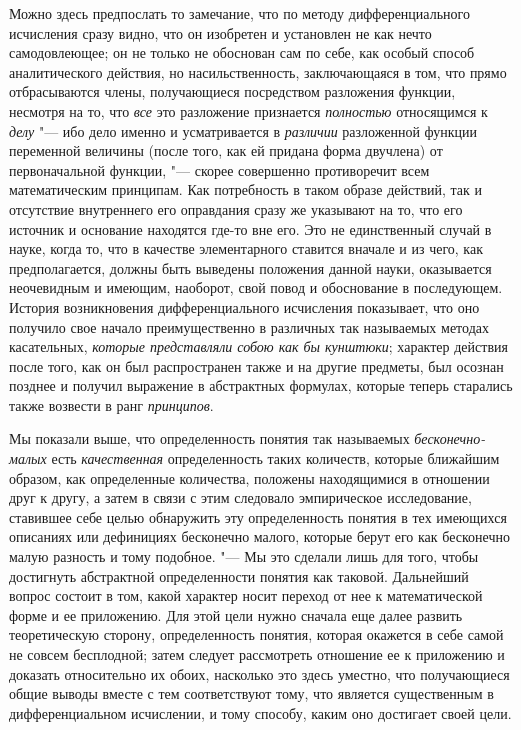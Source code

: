 Можно здесь предпослать то замечание, что по методу дифференциального
исчисления сразу видно, что он изобретен и установлен не как нечто
самодовлеющее; он не только не обоснован сам по себе, как особый способ
аналитического действия, но насильственность, заключающаяся в том, что
прямо отбрасываются члены, получающиеся посредством разложения функции,
несмотря на то, что {\em все} это разложение признается
{\em полностью} относящимся к
{\em делу} "--- ибо дело именно и усматривается в
{\em различии} разложенной функции переменной величины
(после того, как ей придана форма двучлена) от первоначальной функции, "---
скорее совершенно противоречит всем математическим принципам. Как
потребность в таком образе действий, так и отсутствие внутреннего его
оправдания сразу же указывают на то, что его источник и основание находятся
где-то вне его. Это не единственный случай в науке, когда то, что в
качестве элементарного ставится вначале и из чего, как предполагается,
должны быть выведены положения данной науки, оказывается неочевидным и
имеющим, наоборот, свой повод и обоснование в последующем. История
возникновения дифференциального исчисления показывает, что оно получило свое
начало преимущественно в различных так называемых методах касательных,
{\em которые представляли собою как бы кунштюки};
характер действия после того, как он был распространен также и на другие
предметы, был осознан позднее и получил выражение в абстрактных формулах,
которые теперь старались также возвести в ранг
{\em принципов}.

Мы показали выше, что определенность понятия так называемых
{\em бесконечно-малых} есть
{\em качественная} определенность таких количеств,
которые ближайшим образом, как определенные количества, положены
находящимися в отношении друг к другу, а затем в связи с этим следовало
эмпирическое исследование, ставившее себе целью обнаружить эту
определенность понятия в тех имеющихся описаниях или дефинициях бесконечно
малого, которые берут его как бесконечно малую разность и тому подобное. "---
Мы это сделали лишь для того, чтобы достигнуть абстрактной определенности
понятия как таковой. Дальнейший вопрос состоит в том, какой характер носит
переход от нее к математической форме и ее приложению. Для этой цели нужно
сначала еще далее развить теоретическую сторону, определенность понятия,
которая окажется в себе самой не совсем бесплодной; затем следует
рассмотреть отношение ее к приложению и доказать относительно их обоих,
насколько это здесь уместно, что получающиеся общие выводы вместе с тем
соответствуют тому, что является существенным в дифференциальном исчислении,
и тому способу, каким оно достигает своей цели.


